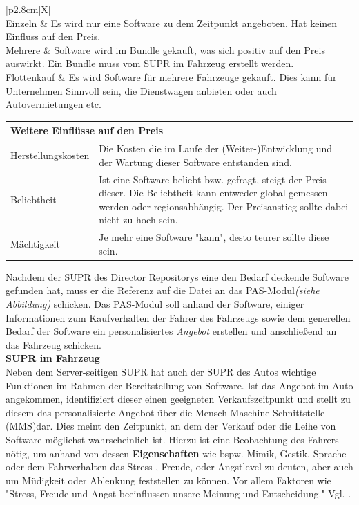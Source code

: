 \begin{center}
	\begin{tabularx}{\linewidth}{|p{2.8cm}|X|}
		\hline
		\\
		\hline
		Einzeln & Es wird nur eine Software zu dem Zeitpunkt angeboten. Hat keinen Einfluss auf den Preis.\\
		\hline
		Mehrere & Software wird im Bundle gekauft, was sich positiv auf den Preis auswirkt. Ein Bundle muss vom SUPR im Fahrzeug erstellt werden.\\[0.5ex]
		\hline
		Flottenkauf & Es wird Software für mehrere Fahrzeuge gekauft. Dies kann für Unternehmen Sinnvoll sein, die Dienstwagen anbieten oder auch Autovermietungen etc.\\
		\hline 
	\end{tabularx}
\end{center}
\begin{center}
	\begin{tabularx}{\linewidth}{|p{2.8cm}|X|}
		\hline
		\multicolumn{2}{|l|}{\textbf{Weitere Einflüsse auf den Preis}}\\
		\hline
		Herstellungskosten & Die Kosten die im Laufe der (Weiter-)Entwicklung und der Wartung dieser Software entstanden sind. \\
		\hline
		Beliebtheit& Ist eine Software beliebt bzw. gefragt, steigt der Preis dieser. Die Beliebtheit kann entweder global gemessen werden oder regionsabhängig. Der Preisanstieg sollte dabei nicht zu hoch sein.\\
		\hline
		Mächtigkeit & Je mehr eine Software "kann", desto teurer sollte diese sein.\\
		\hline
	\end{tabularx}
\end{center}
Nachdem der SUPR des Director Repositorys eine den Bedarf deckende Software gefunden hat, muss er die Referenz auf die Datei an das PAS-Modul\textit{(siehe Abbildung)} schicken. Das PAS-Modul soll anhand der Software, einiger Informationen zum Kaufverhalten der Fahrer des Fahrzeugs sowie dem generellen Bedarf der Software ein personalisiertes \textit{Angebot} erstellen und anschließend an das Fahrzeug schicken.\\
\textbf{SUPR im Fahrzeug}\\
Neben dem Server-seitigen SUPR hat auch der SUPR des Autos wichtige Funktionen im Rahmen der Bereitstellung von Software. 
Ist das Angebot im Auto angekommen, identifiziert dieser einen geeigneten Verkaufszeitpunkt und stellt zu diesem das personalisierte Angebot über die Mensch-Maschine Schnittstelle (MMS)dar. Dies meint den Zeitpunkt, an dem der Verkauf oder die Leihe von Software möglichst wahrscheinlich ist. Hierzu ist eine Beobachtung des Fahrers nötig, um anhand von dessen \textbf{Eigenschaften} wie bspw. Mimik, Gestik, Sprache oder dem Fahrverhalten das Stress-, Freude, oder Angstlevel zu deuten, aber auch um Müdigkeit oder Ablenkung feststellen zu können. Vor allem Faktoren wie "Stress, Freude und Angst beeinflussen unsere Meinung und Entscheidung." Vgl. \cite[S.44]{Spindler2016}.
